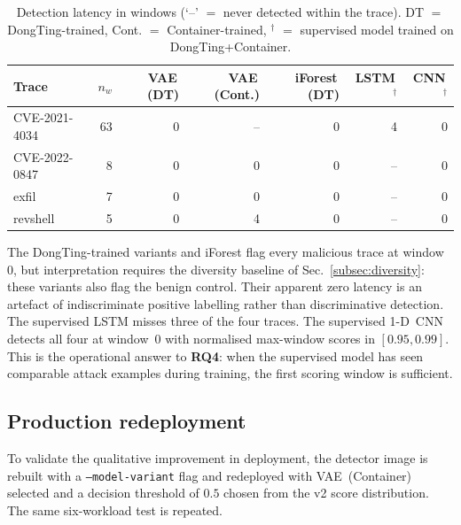 \begin{table}[!t]
\centering
\caption{Detection latency in windows (`--' $=$ never detected within
the trace). DT $=$ DongTing-trained, Cont. $=$ Container-trained,
$^{\dag}$ $=$ supervised model trained on DongTing+Container.}
\label{tab:cve_latency}
\begin{tabular}{lrrrrrr}
\toprule
Trace          & $n_w$ & VAE\,(DT) & VAE\,(Cont.) & iForest\,(DT) & LSTM\,$^{\dag}$ & CNN\,$^{\dag}$ \\
\midrule
CVE-2021-4034  & 63    & 0         & --           & 0             & 4               & 0              \\
CVE-2022-0847  & 8     & 0         & 0            & 0             & --              & 0              \\
exfil          & 7     & 0         & 0            & 0             & --              & 0              \\
revshell       & 5     & 0         & 4            & 0             & --              & 0              \\
\bottomrule
\end{tabular}
\end{table}

The DongTing-trained variants and iForest flag every malicious trace
at window~$0$, but interpretation requires the diversity baseline of
Sec.~\ref{subsec:diversity}: these variants also flag the benign
control. Their apparent zero latency is an artefact of indiscriminate
positive labelling rather than discriminative detection. The
supervised LSTM misses three of the four traces. The supervised 1-D~CNN
detects all four at window~$0$ with normalised max-window scores in
$[0.95, 0.99]$. This is the operational answer to \textbf{RQ4}: when
the supervised model has seen comparable attack examples during
training, the first scoring window is sufficient.

\subsection{Production redeployment}
\label{subsec:redeploy}
To validate the qualitative improvement in deployment, the detector
image is rebuilt with a \texttt{--model-variant} flag and redeployed
with VAE~(Container) selected and a decision threshold of $0.5$
chosen from the v2 score distribution. The same six-workload test
is repeated.

